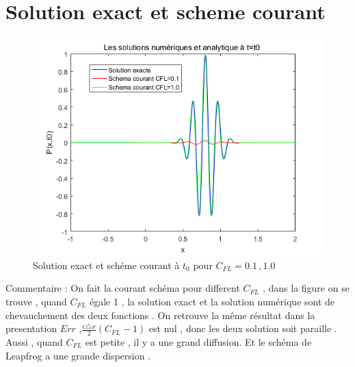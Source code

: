 \documentclass[a4paper,10pt]{report} %
\begin{document}
\section{Solution exact et scheme courant}
\begin{figure}[h]
\begin{center}
\includegraphics[width=1.0\textwidth]{FIG/figure2.png}
\end{center}
\caption{Solution exact et schéme courant à $t_0$ pour $C_{FL}=0.1\,,1.0$}
\label{figure2}
\end{figure}

Commentaire :
On fait la courant schéma pour different $C_{FL}$ , dans la figure on se trouve , quand $C_{FL}$ égale  1 , la solution exact et la solution numérique sont de chevauchement des deux fonctions . On retrouve la même résultat dans la presentation $Err$ ,$\frac{c\triangle x}{2}(C_{FL}-1)$ est nul , donc les deux solution soit paraille .  Aussi , quand $C_{FL}$ est petite , il y a une grand   diffusion. Et le schéma de Leapfrog a une grande dispersion .
\end{document}
